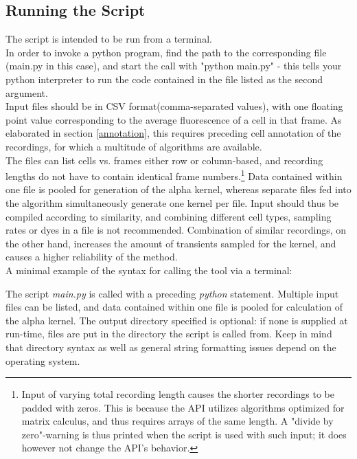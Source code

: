 \documentclass[titlepage]{article}
\begin{document}
\subsection{Running the Script}
The script is intended to be run from a terminal.\\
In order to invoke a python program, find the path to the corresponding file (main.py in this case), and start the call with "python main.py" - this tells your python interpreter to run the code contained in the file listed as the second argument.\\
Input files should be in CSV format(comma-separated values), with one floating point value corresponding to the average fluorescence of a cell in that frame. As elaborated in section \ref{annotation}, this requires preceding cell annotation of the recordings, for which a multitude of algorithms are available.\\
The files can list cells vs. frames either row or column-based, and recording lengths do not have to contain identical frame numbers.\footnote{Input of varying total recording length causes the shorter recordings to be padded with zeros. This is because the API utilizes algorithms optimized for matrix calculus, and thus requires arrays of the same length. A "divide by zero"-warning is thus printed when the script is used with such input; it does however not change the API's behavior.} 
Data contained within one file is pooled for generation of the alpha kernel, whereas separate files fed into the algorithm simultaneously generate one kernel per file. Input should thus be compiled according to similarity, and combining different cell types, sampling rates or dyes in a file is not recommended. Combination of similar recordings, on the other hand, increases the amount of transients sampled for the kernel, and causes a higher reliability of the method. \\
A minimal example of the syntax for calling the tool via a terminal:
\begin{mdframed}[backgroundcolor=black] 
\color{green}{$>>$ python /path/to/script/main.py InputFile}
\end{mdframed}
The script \emph{main.py} is called with a preceding \emph{python} statement. Multiple input files can be listed, and data contained within one file is pooled for calculation of the alpha kernel. The output directory specified is optional: if none is supplied at run-time, files are put in the directory the script is called from. Keep in mind that directory syntax as well as general string formatting issues depend on the operating system.
\end{document}
